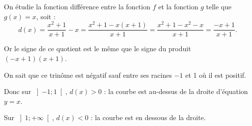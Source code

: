 	On étudie la fonction différence entre la fonction \(f\) et la fonction \(g\) telle que \(g(x) = x\), soit :
	\[
	d(x) = \dfrac{x^2 + 1}{x + 1} - x = \dfrac{x^2 + 1 - x(x + 1)}{x + 1} = \dfrac{x^2 + 1 - x^2 - x}{x + 1} = \dfrac{-x + 1}{x + 1}.
	\]
	
	Or le signe de ce quotient est le même que le signe du produit \((-x + 1)(x + 1)\).
	
	On sait que ce trinôme est négatif sauf entre ses racines \(-1\) et 1 où il est positif.
	
	Donc sur \(\left] -1 ; 1 \right[\), \(d(x) > 0\) : la courbe est au-dessus de la droite d'équation \(y = x\).
	
	Sur \(\left] 1 ; +\infty \right[\), \(d(x) < 0\) : la courbe est en dessous de la droite.
